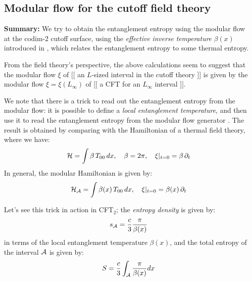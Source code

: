 \documentclass[11pt,a4paper]{article}
\begin{document}
\subsection{Modular flow for the cutoff field theory}
\textbf{Summary:} We try to obtain the entanglement entropy using the modular flow at the \mbox{codim-2} cutoff surface, using the \textit{effective inverse temperature $\beta(x)$} introduced in \cite{Cardy:2016fqc}, which relates the entanglement entropy to some thermal entropy. 
	
	From the field theory's perspective, the above calculations seem to suggest that the modular flow $\xi$ of [[ an $L$-sized interval in the cutoff theory ]] is given by the modular flow $\xi = \xi(L_\infty)$ of [[ a CFT for an $L_\infty$ interval ]]. 
	
	We note that there is a trick to read out the entanglement entropy from the modular flow: it is possible to define a \textit{local entanglement temperature}, and then use it to read the entanglement entropy from the modular flow generator \cite{Cardy:2016fqc}. The result is obtained by comparing with the Hamiltonian of a thermal field theory, where we have:
	\begin{equation}
	\mathcal{H}=\int \beta\,T_{00}\,dx,\quad \beta = 2\pi,
	\quad \xi|_{t=0} = \beta\,\partial_{t}
	\label{eq:beta_thermal}
	\end{equation}
	In general, the modular Hamiltonian is given by:
	\begin{equation}
	\mathcal{H}_{\mathcal{A}}=\int \beta(x)\, T_{00}\,dx,\quad \xi|_{t=0} = \beta(x)\, \partial_{t}
	\end{equation}
	
	Let's see this trick in action in CFT$_2$; the \textit{entropy density} is given by:
	\begin{equation}
	s_{\mathcal{A}} = \frac{c}{3} \frac{\pi}{\beta(x)}
	\end{equation}
	in terms of the local entanglement temperature $\beta(x)$, and the total entropy of the interval $\mathcal{A}$ is given by:
	\begin{equation}
	S= \frac{c}{3}
		\int_{\mathcal{A}} \frac{\pi}{\beta(x)}dx
	\end{equation}
	
\end{document}
